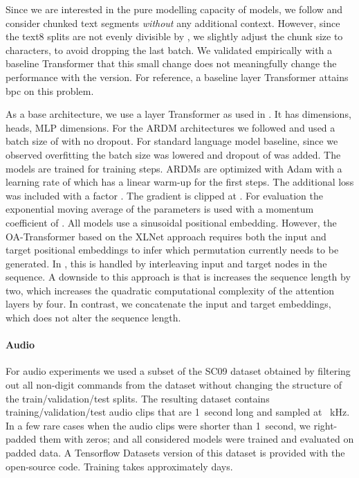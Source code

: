 \documentclass{article} \usepackage{iclr2022_conference,times}
\begin{document}
Since we are interested in the pure modelling capacity of models, we follow \citep{hoogeboom2021argmaxflows, austin2021structured} and consider chunked text segments \textit{without} any additional context. However, since the text8 splits are not evenly divisible by , we slightly adjust the chunk size to  characters, to avoid dropping the last batch. We validated empirically with a baseline Transformer that this small change does not meaningfully change the performance with the  version. For reference, a baseline  layer Transformer attains  bpc on this problem. 

As a base architecture, we use a  layer Transformer as used in \citep{austin2021structured}. It has  dimensions,  heads,  MLP dimensions. For the ARDM architectures we followed \citep{austin2021structured} and used a batch size of  with no dropout. For standard language model baseline, since we observed overfitting the batch size was lowered and dropout of  was added. The models are trained for  training steps. ARDMs are optimized with Adam with a learning rate of  which has a linear warm-up for the first  steps. The additional  loss was included with a factor . The gradient is clipped at . For evaluation the exponential moving average of the parameters is used with a momentum coefficient of . All models use a sinusoidal positional embedding. However, the OA-Transformer based on the XLNet approach \citep{yang2019xlnet} requires both the input and target positional embeddings to infer which permutation currently needs to be generated. In \citep{alcorn2021DEformer}, this is handled by interleaving input and target nodes in the sequence. A downside to this approach is that is increases the sequence length by two, which increases the quadratic computational complexity of the attention layers by four. In contrast, we concatenate the input and target embeddings, which does not alter the sequence length.


\paragraph{Audio}
For audio experiments we used a subset of the SC09 dataset \citep{speechcommandsv2} obtained by filtering out all non-digit commands from the dataset without changing the structure of the train/validation/test splits. The resulting dataset contains  training/validation/test audio clips that are 1~second long and sampled at ~kHz. In a few rare cases when the audio clips were shorter than 1~second, we right-padded them with zeros; and all considered models were trained and evaluated on padded data. A Tensorflow Datasets \cite{TFDS} version of this dataset is provided with the open-source code. Training takes approximately  days.
\end{document}
